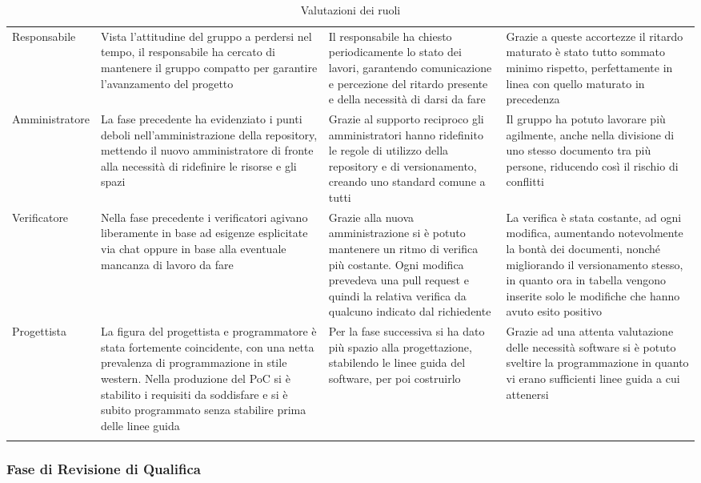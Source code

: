 \documentclass[../piano_di_qualifica.tex]{subfiles}
\begin{document}
\begin{center}
\begin{longtable}{|p{2.5cm}|p{4.5cm}|p{4.5cm}|p{4.5cm}|}
		Responsabile & Vista l’attitudine del gruppo a perdersi nel tempo, il responsabile ha cercato di mantenere il gruppo compatto per garantire l’avanzamento del progetto & Il responsabile ha chiesto periodicamente lo stato dei lavori, garantendo comunicazione e percezione del ritardo presente e della necessità di darsi da fare & Grazie a queste accortezze il ritardo maturato è stato tutto sommato minimo rispetto, perfettamente in linea con quello maturato in precedenza \\
		Amministratore & La fase precedente ha evidenziato i punti deboli nell’amministrazione della repository, mettendo il nuovo amministratore di fronte alla necessità di ridefinire le risorse e gli spazi & Grazie al supporto reciproco gli amministratori hanno ridefinito le regole di utilizzo della repository e di versionamento, creando uno standard comune a tutti & Il gruppo ha potuto lavorare più agilmente, anche nella divisione di uno stesso documento tra più persone, riducendo così il rischio di conflitti  \\
		Verificatore & Nella fase precedente i verificatori agivano liberamente in base ad esigenze esplicitate via chat oppure in base alla eventuale mancanza di lavoro da fare & Grazie alla nuova amministrazione si è potuto mantenere un ritmo di verifica più costante. Ogni modifica prevedeva una pull request e quindi la relativa verifica da qualcuno indicato dal richiedente & La verifica è stata costante, ad ogni modifica, aumentando notevolmente la bontà dei documenti, nonché migliorando il versionamento stesso, in quanto ora in tabella vengono inserite solo le modifiche che hanno avuto esito positivo \\
		Progettista & La figura del progettista e programmatore è stata fortemente coincidente, con una netta prevalenza di programmazione in stile western. Nella produzione del PoC si è stabilito i requisiti da soddisfare e si è subito programmato senza stabilire prima delle linee guida & Per la fase successiva si ha dato più spazio alla progettazione, stabilendo le linee guida del software, per poi costruirlo & Grazie ad una attenta valutazione delle necessità software si è potuto sveltire la programmazione in quanto vi erano sufficienti linee guida a cui attenersi \\

		\hline
		\rowcolor{white}
		\caption{Valutazioni dei ruoli}
	\end{longtable}
\end{center}

\subsubsection{Fase di Revisione di Qualifica}
\end{document}
